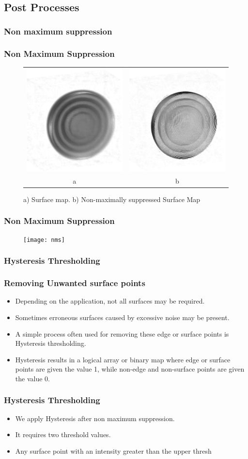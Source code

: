 \documentclass[9pt]{beamer}
\begin{document}
	


	
	\subsection{Post Processes}
\subsubsection{Non maximum suppression}
		\begin{frame}
			\frametitle{Non Maximum Suppression}
				
					\begin{figure}
\begin{tabular}{c c}
\includegraphics[scale=0.3]{outT}&\includegraphics[scale=0.3]{outnms}\\
a & b
\end{tabular}
\caption{a) Surface map. b) Non-maximally suppressed Surface Map} 
					\end{figure}

	\end{frame}	
	\begin{frame}
			\frametitle{Non Maximum Suppression}
				
					\begin{figure}
							\texttt{[image: nms]}
					\end{figure}

	\end{frame}

	\subsubsection{Hysteresis Thresholding}
			\begin{frame}
				\frametitle{Removing Unwanted surface points}
				
					\begin{itemize}
						\item Depending on the application, not all surfaces may be required.
						\item Sometimes erroneous surfaces caused by excessive noise may be present.
						\item A simple process often used for removing these edge or surface points is Hysteresis thresholding.
						\item Hysteresis results in a logical array or binary map where edge or surface points are given the value 1, while non-edge and non-surface points are given the value 0.
					\end{itemize}		
				
			\end{frame}
			
			\begin{frame}
			
			\frametitle{Hysteresis Thresholding}
			
					
						\begin{itemize}					
							\item We apply Hysteresis after non maximum suppression.
							\item It requires two threshold values. 
							\item Any surface point with an intensity greater than the upper thresh
\end{itemize}
\end{frame}
\end{document}
